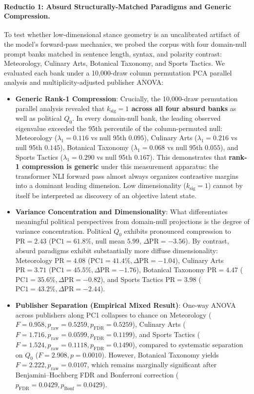 \paragraph{Reductio 1: Absurd Structurally-Matched Paradigms and Generic Compression.}
To test whether low-dimensional stance geometry is an uncalibrated artifact of the model's forward-pass mechanics, we probed the corpus with four domain-null prompt banks matched in sentence length, syntax, and polarity contrast: Meteorology, Culinary Arts, Botanical Taxonomy, and Sports Tactics. We evaluated each bank under a 10,000-draw column permutation PCA parallel analysis and multiplicity-adjusted publisher ANOVA:
\begin{itemize}
    \item \textbf{Generic Rank-1 Compression}: Crucially, the 10,000-draw permutation parallel analysis revealed that \textbf{$k_{\text{sig}} = 1$ across all four absurd banks} as well as political $Q_0$. In every domain-null bank, the leading observed eigenvalue exceeded the 95th percentile of the column-permuted null: Meteorology ($\lambda_1 = 0.116$ vs null 95th $0.095$), Culinary Arts ($\lambda_1 = 0.216$ vs null 95th $0.145$), Botanical Taxonomy ($\lambda_1 = 0.068$ vs null 95th $0.055$), and Sports Tactics ($\lambda_1 = 0.290$ vs null 95th $0.167$). This demonstrates that \textbf{rank-1 compression is generic} under this measurement apparatus: the transformer NLI forward pass almost always organizes contrastive margins into a dominant leading dimension. Low dimensionality ($k_{\text{sig}} = 1$) cannot by itself be interpreted as discovery of an objective latent state.
    \item \textbf{Variance Concentration and Dimensionality}: What differentiates meaningful political perspectives from domain-null projections is the degree of variance concentration. Political $Q_0$ exhibits pronounced compression to $\mathrm{PR} = 2.43$ ($\mathrm{PC1} = 61.8\%$, null mean $5.99$, $\Delta \mathrm{PR} = -3.56$). By contrast, absurd paradigms exhibit substantially more diffuse dimensionality: Meteorology $\mathrm{PR} = \mathbf{4.08}$ ($\mathrm{PC1} = 41.4\%, \Delta \mathrm{PR} = -1.04$), Culinary Arts $\mathrm{PR} = \mathbf{3.71}$ ($\mathrm{PC1} = 45.5\%, \Delta \mathrm{PR} = -1.76$), Botanical Taxonomy $\mathrm{PR} = \mathbf{4.47}$ ($\mathrm{PC1} = 35.6\%, \Delta \mathrm{PR} = -0.82$), and Sports Tactics $\mathrm{PR} = \mathbf{3.98}$ ($\mathrm{PC1} = 43.2\%, \Delta \mathrm{PR} = -2.44$).
    \item \textbf{Publisher Separation (Empirical Mixed Result)}: One-way ANOVA across publishers along PC1 collapses to chance on Meteorology ($F = 0.958, p_{\text{raw}} = 0.5259, p_{\text{FDR}} = 0.5259$), Culinary Arts ($F = 1.716, p_{\text{raw}} = 0.0599, p_{\text{FDR}} = 0.1199$), and Sports Tactics ($F = 1.524, p_{\text{raw}} = 0.1118, p_{\text{FDR}} = 0.1490$), compared to systematic separation on $Q_0$ ($F = 2.908, p = 0.0010$). However, Botanical Taxonomy yields $F = 2.222, p_{\text{raw}} = 0.0107$, which remains marginally significant after Benjamini--Hochberg FDR and Bonferroni correction ($p_{\text{FDR}} = 0.0429, p_{\text{Bonf}} = 0.0429$).
\end{itemize}
